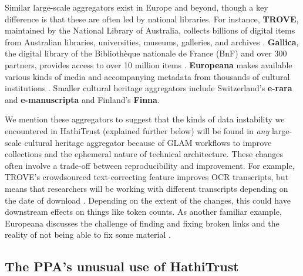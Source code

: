 \documentclass{anthology-ch}         %
\begin{document}
Similar large-scale aggregators exist in Europe and beyond, though a key difference is that these are often led by national libraries. For instance, \textbf{TROVE}, maintained by the National Library of Australia, collects billions of digital items from Australian libraries, universities, museums, galleries, and archives \cite{noauthor_home_nodate}. \textbf{Gallica}, the digital library of the Bibliothèque nationale de France (BnF) and over 300 partners, provides access to over 10 million items \cite{noauthor_page_nodate}. \textbf{Europeana} makes available various kinds of media and accompanying metadata from thousands of cultural institutions \cite{noauthor_discover_nodate}. Smaller cultural heritage aggregators include Switzerland’s \textbf{e-rara}\cite{noauthor_e-rara_nodate} and \textbf{e-manuscripta}\cite{noauthor_e-manuscripta_nodate} and Finland’s \textbf{Finna}\cite{noauthor_search_nodate}. 

We mention these aggregators to suggest that the kinds of data instability we encountered in HathiTrust (explained further below) will be found in \textit{any }large-scale cultural heritage aggregator because of GLAM workflows to improve collections and the ephemeral nature of technical architecture. These changes often involve a trade-off between reproducibility and improvement. For example, TROVE’s crowdsourced text-correcting feature improves OCR transcripts, but means that researchers will be working with different transcripts depending on the date of download \cite{noauthor_text_nodate}. Depending on the extent of the changes, this could have downstream effects on things like token counts. As another familiar example, Europeana discusses the challenge of finding and fixing broken links and the reality of not being able to fix some material \cite{noauthor_keeping_nodate}.

\subsection{The PPA’s unusual use of HathiTrust}
\end{document}
